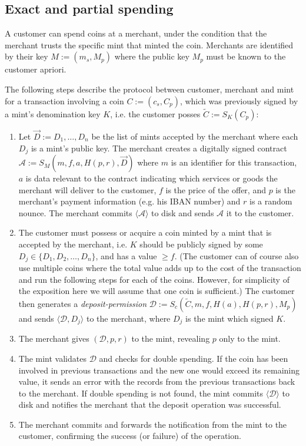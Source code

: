 \documentclass{llncs}
\begin{document}
\subsection{Exact and partial spending}

A customer can spend coins at a merchant, under the condition that the
merchant trusts the specific mint that minted the coin.  Merchants are
identified by their key $M := (m_s, M_p)$ where the public key $M_p$
must be known to the customer apriori.

The following steps describe the protocol between customer, merchant and mint
for a transaction involving a coin $C := (c_s, C_p)$, which was previously signed
by a mint's denomination key $K$, i.e. the customer posses
$\widetilde{C} := S_K(C_p)$:

\begin{enumerate}
\item\label{contract} Let $\vec{D} := D_1, \ldots, D_n$ be the list of
  mints accepted by the merchant where each $D_j$ is a mint's public
  key.  The merchant creates a digitally signed contract $\mathcal{A}
  := S_M(m, f, a, H(p, r), \vec{D})$ where $m$ is an identifier for this
  transaction, $a$ is data relevant to the contract indicating which services
  or goods the merchant will deliver to the customer, $f$ is the price of the offer,
  and $p$ is the merchant's payment information (e.g. his IBAN number) and $r$ is
  a random nounce.  The merchant commits $\langle \mathcal{A}
  \rangle$ to disk and sends $\mathcal{A}$ it to the customer.
\item\label{deposit} The customer must possess or acquire a coin minted by a mint that is
  accepted by the merchant, i.e. $K$ should be publicly signed by some $D_j
  \in \{D_1, D_2, \ldots, D_n\}$, and has a value $\geq f$. (The customer
  can of course also use multiple coins where the total value adds up to
  the cost of the transaction and run the following steps for each of
  the coins. However, for simplicity of the exposition here we will
  assume that one coin is sufficient.)
%
  The customer then generates a \emph{deposit-permission} $\mathcal{D} :=
  S_c(\widetilde{C}, m, f, H(a), H(p,r), M_p)$
  and sends $\langle \mathcal{D}, D_j\rangle$ to the merchant,
  where $D_j$ is the mint which signed $K$.
\item The merchant gives $(\mathcal{D}, p, r)$ to the mint, revealing $p$
  only to the mint.

\item The mint validates $\mathcal{D}$ and checks for double spending.
  If the coin has been involved in previous transactions and the new
  one would exceed its remaining value, it sends an error
  with the records from the previous transactions back to the merchant.
%
  If double spending is not found, the mint commits $\langle \mathcal{D} \rangle$ to disk
  and notifies the merchant that the deposit operation was successful.

\item The merchant commits and forwards the notification from the mint to the
  customer, confirming the success (or failure) of the operation.
\end{enumerate}
\end{document}
